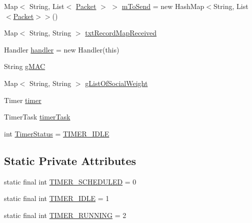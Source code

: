 \begin{DoxyCompactItemize}
Map$<$ String, List$<$ \hyperlink{classcom_1_1copelabs_1_1oiframework_1_1contentmanager_1_1_packet}{Packet} $>$ $>$ \hyperlink{classcom_1_1copelabs_1_1oiframework_1_1wifi_1_1_wi_fi_direct_utils_adc302a47dc2b014b1bcb2e7b8c36d89e}{m\+To\+Send} = new Hash\+Map$<$String, List$<$\hyperlink{classcom_1_1copelabs_1_1oiframework_1_1contentmanager_1_1_packet}{Packet}$>$$>$()
\item 
Map$<$ String, String $>$ \hyperlink{classcom_1_1copelabs_1_1oiframework_1_1wifi_1_1_wi_fi_direct_utils_ae643bebb0cc85f9a557413bcf7afb9b2}{txt\+Record\+Map\+Received}
\item 
Handler \hyperlink{classcom_1_1copelabs_1_1oiframework_1_1wifi_1_1_wi_fi_direct_utils_af585a8ac857febc2ac01888cb7281db2}{handler} = new Handler(this)
\item 
String \hyperlink{classcom_1_1copelabs_1_1oiframework_1_1wifi_1_1_wi_fi_direct_utils_ac93d36f52a2d27a702322658a52569f6}{g\+M\+A\+C}
\item 
Map$<$ String, String $>$ \hyperlink{classcom_1_1copelabs_1_1oiframework_1_1wifi_1_1_wi_fi_direct_utils_a9fb931d36d984609a1a438e76a753790}{g\+List\+Of\+Social\+Weight}
\item 
Timer \hyperlink{classcom_1_1copelabs_1_1oiframework_1_1wifi_1_1_wi_fi_direct_utils_aa66d30aadcb2ba02d910e98327b61f1a}{timer}
\item 
Timer\+Task \hyperlink{classcom_1_1copelabs_1_1oiframework_1_1wifi_1_1_wi_fi_direct_utils_a3a93c679b0704667788686d3652854f1}{timer\+Task}
\item 
int \hyperlink{classcom_1_1copelabs_1_1oiframework_1_1wifi_1_1_wi_fi_direct_utils_a3f50e5b81fe54d1731f2686736c5182f}{Timer\+Status} = \hyperlink{classcom_1_1copelabs_1_1oiframework_1_1wifi_1_1_wi_fi_direct_utils_a4c9d3b2c01e26a2f1aaf9d414b60855b}{T\+I\+M\+E\+R\+\_\+\+I\+D\+L\+E}
\end{DoxyCompactItemize}
\subsection*{Static Private Attributes}
\begin{DoxyCompactItemize}
\item 
static final int \hyperlink{classcom_1_1copelabs_1_1oiframework_1_1wifi_1_1_wi_fi_direct_utils_a21f1e471e63b1a57104251c83dccb54e}{T\+I\+M\+E\+R\+\_\+\+S\+C\+H\+E\+D\+U\+L\+E\+D} = 0
\item 
static final int \hyperlink{classcom_1_1copelabs_1_1oiframework_1_1wifi_1_1_wi_fi_direct_utils_a4c9d3b2c01e26a2f1aaf9d414b60855b}{T\+I\+M\+E\+R\+\_\+\+I\+D\+L\+E} = 1
\item 
static final int \hyperlink{classcom_1_1copelabs_1_1oiframework_1_1wifi_1_1_wi_fi_direct_utils_a60092661737932b1d93aa856d541397e}{T\+I\+M\+E\+R\+\_\+\+R\+U\+N\+N\+I\+N\+G} = 2
\end{DoxyCompactItemize}



